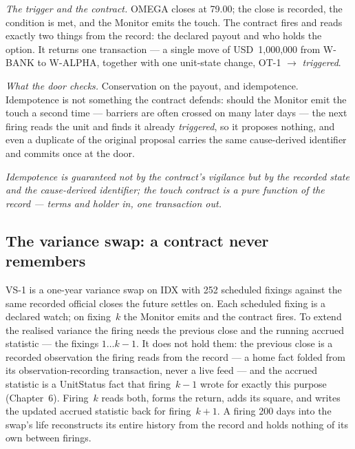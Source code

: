 \documentclass[11pt,a4paper]{article}
\newcommand{\USD}[1]{\mbox{USD~#1}}
\begin{document}
\emph{The trigger and the contract.} OMEGA closes at 79.00; the close is
recorded, the condition is met, and the Monitor emits the touch. The contract
fires and reads exactly two things from the record: the declared payout and who
holds the option. It returns one transaction --- a single move of
\USD{1{,}000{,}000} from W-BANK to W-ALPHA, together with one unit-state change,
OT-1 $\rightarrow$ \emph{triggered}.

\emph{What the door checks.} Conservation on the payout, and idempotence.
Idempotence is not something the contract defends: should the Monitor emit the
touch a second time --- barriers are often crossed on many later days --- the
next firing reads the unit and finds it already \emph{triggered}, so it proposes
nothing, and even a duplicate of the original proposal carries the same
cause-derived identifier and commits once at the door.

\emph{Idempotence is guaranteed not by the contract's vigilance but by the
recorded state and the cause-derived identifier; the touch contract is a pure
function of the record --- terms and holder in, one transaction out.}

\subsection{The variance swap: a contract never remembers}

VS-1 is a one-year variance swap on IDX with 252 scheduled fixings against the
same recorded official closes the future settles on. Each scheduled fixing is a
declared watch; on fixing~$k$ the Monitor emits and the contract fires. To
extend the realised variance the firing needs the previous close and the running
accrued statistic --- the fixings $1 \ldots k-1$. It does not hold them: the
previous close is a recorded observation the firing reads from the record --- a
home fact folded from its observation-recording transaction, never a live feed ---
and the accrued statistic is a UnitStatus fact that firing~$k-1$ wrote for exactly
this purpose (Chapter~6).
Firing~$k$ reads both, forms the return, adds its square, and writes the updated
accrued statistic back for firing~$k+1$. A firing 200 days into the swap's life
reconstructs its entire history from the record and holds nothing of its own
between firings.
\end{document}
